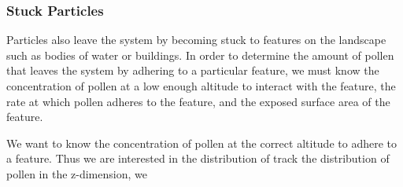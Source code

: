 \documentclass{article}
\begin{document}
\subsubsection{Stuck Particles}

Particles also leave the system by becoming stuck to features on the landscape such as bodies of water or buildings. In order to determine the amount of pollen that leaves the system by adhering to a particular feature, we must know the concentration of pollen at a low enough altitude to interact with the feature, the rate at which pollen adheres to the feature, and the exposed surface area of the feature.


We want to know the concentration of pollen at the correct altitude to adhere to a feature. Thus we are interested in the distribution of track the distribution of pollen in the z-dimension, we 
\end{document}
